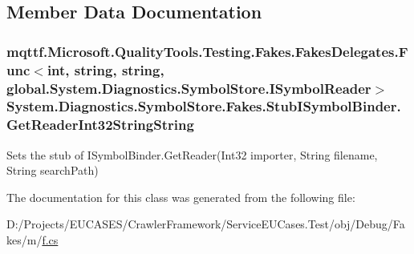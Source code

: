 \subsection{Member Data Documentation}
\hypertarget{class_system_1_1_diagnostics_1_1_symbol_store_1_1_fakes_1_1_stub_i_symbol_binder_a7e893f0fae5d8d52bfca1f997a52317d}{
\subsubsection[{Get\-Reader\-Int32\-String\-String}]{\setlength{\rightskip}{0pt plus 5cm}mqttf.\-Microsoft.\-Quality\-Tools.\-Testing.\-Fakes.\-Fakes\-Delegates.\-Func$<$int, string, string, global.\-System.\-Diagnostics.\-Symbol\-Store.\-I\-Symbol\-Reader$>$ System.\-Diagnostics.\-Symbol\-Store.\-Fakes.\-Stub\-I\-Symbol\-Binder.\-Get\-Reader\-Int32\-String\-String}}\label{class_system_1_1_diagnostics_1_1_symbol_store_1_1_fakes_1_1_stub_i_symbol_binder_a7e893f0fae5d8d52bfca1f997a52317d}


Sets the stub of I\-Symbol\-Binder.\-Get\-Reader(\-Int32 importer, String filename, String search\-Path)



The documentation for this class was generated from the following file\-:\begin{DoxyCompactItemize}
\item 
D\-:/\-Projects/\-E\-U\-C\-A\-S\-E\-S/\-Crawler\-Framework/\-Service\-E\-U\-Cases.\-Test/obj/\-Debug/\-Fakes/m/\hyperlink{m_2f_8cs}{f.\-cs}\end{DoxyCompactItemize}
